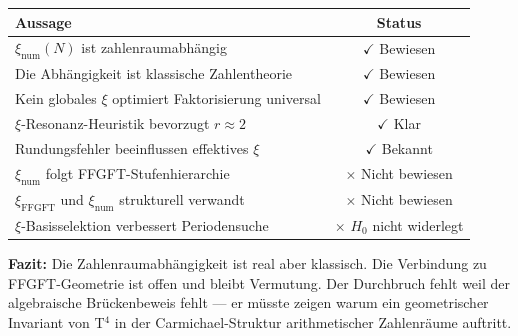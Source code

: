 \begin{center}
\begin{tabular}{lc}
\toprule
Aussage & Status \\
\midrule
$\xi_\text{num}(N)$ ist zahlenraumabhängig & $\checkmark$ Bewiesen \\
Die Abhängigkeit ist klassische Zahlentheorie & $\checkmark$ Bewiesen \\
Kein globales $\xi$ optimiert Faktorisierung universal & $\checkmark$ Bewiesen \\
$\xi$-Resonanz-Heuristik bevorzugt $r \approx 2$ & $\checkmark$ Klar \\
Rundungsfehler beeinflussen effektives $\xi$ & $\checkmark$ Bekannt \\
$\xi_\text{num}$ folgt FFGFT-Stufenhierarchie & $\times$ Nicht bewiesen \\
$\xi_\text{FFGFT}$ und $\xi_\text{num}$ strukturell verwandt & $\times$ Nicht bewiesen \\
$\xi$-Basisselektion verbessert Periodensuche & $\times$ $H_0$ nicht widerlegt \\
\bottomrule
\end{tabular}
\end{center}

\begin{mdframed}[style=info]
\textbf{Fazit:} Die Zahlenraumabhängigkeit ist real aber klassisch. Die Verbindung
zu FFGFT-Geometrie ist offen und bleibt Vermutung. Der Durchbruch fehlt weil
der algebraische Brückenbeweis fehlt — er müsste zeigen warum ein geometrischer
Invariant von T$^4$ in der Carmichael-Struktur arithmetischer Zahlenräume auftritt.
\end{mdframed}
